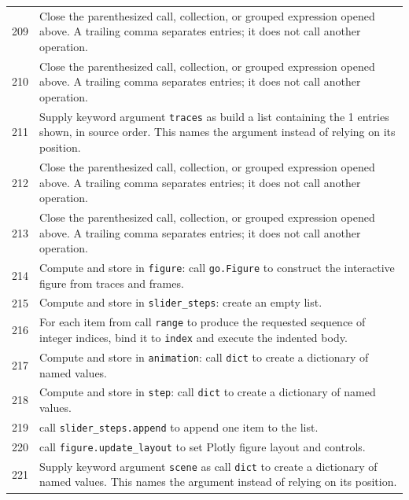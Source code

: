 \documentclass[11pt,a4paper]{book}
\begin{document}
\begin{longtable}{r p{}}
209 & Close the parenthesized call, collection, or grouped expression opened above. A trailing comma separates entries; it does not call another operation. \\

210 & Close the parenthesized call, collection, or grouped expression opened above. A trailing comma separates entries; it does not call another operation. \\

211 & Supply keyword argument \texttt{traces} as build a list containing the 1 entries shown, in source order. This names the argument instead of relying on its position. \\

212 & Close the parenthesized call, collection, or grouped expression opened above. A trailing comma separates entries; it does not call another operation. \\

213 & Close the parenthesized call, collection, or grouped expression opened above. A trailing comma separates entries; it does not call another operation. \\

214 & Compute and store in \texttt{figure}: call \texttt{go.Figure} to construct the interactive figure from traces and frames.  \\

215 & Compute and store in \texttt{slider\_steps}: create an empty list.  \\

216 & For each item from call \texttt{range} to produce the requested sequence of integer indices, bind it to \texttt{index} and execute the indented body. \\

217 & Compute and store in \texttt{animation}: call \texttt{dict} to create a dictionary of named values.  \\

218 & Compute and store in \texttt{step}: call \texttt{dict} to create a dictionary of named values.  \\

219 & call \texttt{slider\_steps.append} to append one item to the list. \\

220 & call \texttt{figure.update\_layout} to set Plotly figure layout and controls. \\

221 & Supply keyword argument \texttt{scene} as call \texttt{dict} to create a dictionary of named values. This names the argument instead of relying on its position. \\


\end{longtable}
\end{document}
